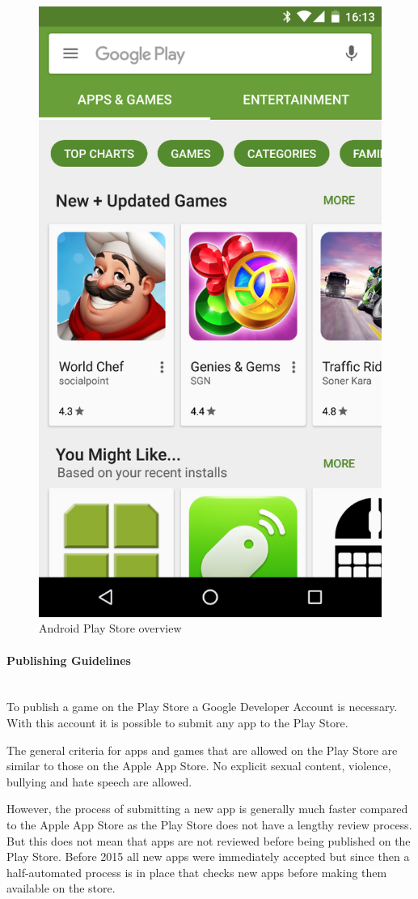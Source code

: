 \begin{figure}[!hbp]
\includegraphics[height=\linewidth]{img/android.png}
\centering
\caption{ Android Play Store overview}
\label{fig:android}
\end{figure}

\paragraph{Publishing Guidelines}\mbox{}\\
To publish a game on the Play Store a Google Developer Account is necessary. With this account it is possible to submit any app to the Play Store. 

The general criteria for apps and games that are allowed on the Play Store are similar to those on the Apple App Store. No explicit sexual content, violence, bullying and hate speech are allowed.

However, the process of submitting a new app is generally much faster compared to the Apple App Store as the Play Store does not have a lengthy review process. But this does not mean that apps are not reviewed before being published on the Play Store. Before 2015 all new apps were immediately accepted but since then a half-automated process is in place that checks new apps before making them available on the store. \citep{perez_app_2015}

